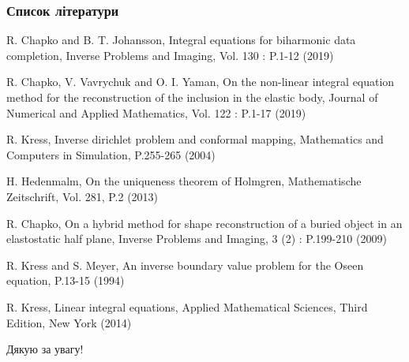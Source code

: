 \documentclass[10pt]{beamer}
\begin{document}
\begin{frame}
\frametitle{Список літератури}
\begin{thebibliography}{99}

\scriptsize

R. Chapko and B. T. Johansson, Integral equations for biharmonic data completion, Inverse Problems and Imaging, Vol. 130 : P.1-12 (2019)
 
 R. Chapko, V. Vavrychuk and O. I. Yaman, On the non-linear integral equation method for the reconstruction of the inclusion in the elastic body, Journal of Numerical and Applied Mathematics, Vol. 122 : P.1-17 (2019)
 
R. Kress, Inverse dirichlet problem and conformal mapping, Mathematics and Computers in Simulation, P.255-265 (2004)
 
H. Hedenmalm, On the uniqueness theorem of Holmgren, Mathematische Zeitschrift, Vol. 281, P.2 (2013)

R. Chapko, On a hybrid method for shape reconstruction of a buried object in an elastostatic half plane, Inverse Problems and Imaging, 3 (2) : P.199-210 (2009)

R. Kress and S. Meyer, An inverse boundary value problem for the Oseen equation, P.13-15 (1994)
 
R. Kress, Linear integral equations, Applied Mathematical Sciences, Third Edition, New York (2014) 

\end{thebibliography}
\end{frame}

\begin{frame}{}
  \centering \huge
  Дякую за увагу!
\end{frame}
 
\end{document}
